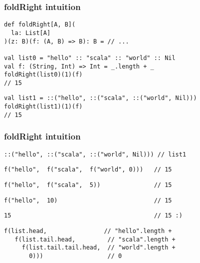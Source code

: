 \documentclass[include/preamble.tex]{subfiles}
\begin{document}
\begin{frame}[fragile]
  \frametitle{foldRight intuition}
  \begin{center}
    \begin{lstlisting}[style=scala]
def foldRight[A, B](
  la: List[A]
)(z: B)(f: (A, B) => B): B = // ...

val list0 = "hello" :: "scala" :: "world" :: Nil
val f: (String, Int) => Int = _.length + _
foldRight(list0)(1)(f)
// 15
    \end{lstlisting}
    \pause
    \begin{lstlisting}[style=scala]
val list1 = ::("hello", ::("scala", ::("world", Nil)))
foldRight(list1)(1)(f)
// 15
    \end{lstlisting}
  \end{center}
\end{frame}

\begin{frame}[fragile]
  \frametitle{foldRight intuition}
  \begin{center}
    \lstset{aboveskip=0pt,belowskip=0pt}
    \begin{lstlisting}[style=scala]
::("hello", ::("scala", ::("world", Nil))) // list1
    \end{lstlisting}
    \pause
    \vspace{1em}
    \begin{lstlisting}[style=scala]
 f("hello",  f("scala",  f("world", 0)))   // 15
    \end{lstlisting}
    \pause
    \begin{lstlisting}[style=scala]
 f("hello",  f("scala",  5))               // 15
    \end{lstlisting}
    \pause
    \begin{lstlisting}[style=scala]
 f("hello",  10)                           // 15
    \end{lstlisting}
    \pause
    \begin{lstlisting}[style=scala]
 15                                        // 15 :)
    \end{lstlisting}
    \pause
    \vspace{1em}
    \begin{lstlisting}[style=scala]
 f(list.head,                // "hello".length +
   f(list.tail.head,         // "scala".length +
     f(list.tail.tail.head,  // "world".length +
       0)))                  // 0
    \end{lstlisting}
  \end{center}
\end{frame}
\end{document}
